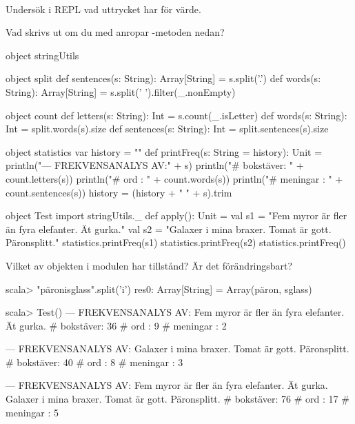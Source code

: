 
\QUESTBEGIN

\Task  \what~

\Subtask Undersök i REPL vad uttrycket  har för värde.

\Subtask Vad skrivs ut om du med  anropar -metoden nedan?
\begin{CodeSmall}
object stringUtils {
  object split {
    def sentences(s: String): Array[String] = s.split('.')
    def words(s: String): Array[String] = s.split(' ').filter(_.nonEmpty)
  }

  object count {
    def letters(s: String):   Int = s.count(_.isLetter)
    def words(s: String):     Int = split.words(s).size
    def sentences(s: String): Int = split.sentences(s).size
  }

  object statistics {
    var history = ""
    def printFreq(s: String = history): Unit = {
      println("\n--- FREKVENSANALYS AV:\n" + s)
      println("# bokstäver: " + count.letters(s))
      println("# ord      : " + count.words(s))
      println("# meningar : " + count.sentences(s))
      history = (history + " " + s).trim
    }
  }
}

object Test {
  import stringUtils._
  def apply(): Unit = {
    val s1 = "Fem     myror är fler än fyra elefanter. Ät gurka."
    val s2 = "Galaxer i mina braxer. Tomat är gott. Päronsplitt."
    statistics.printFreq(s1)
    statistics.printFreq(s2)
    statistics.printFreq()
  }
}
\end{CodeSmall}

\Subtask Vilket av objekten i modulen  har tillstånd? Är det förändringsbart?


\SOLUTION


\TaskSolved \what

\SubtaskSolved
\begin{REPLnonum}
scala> "päronisglass".split('i')
res0: Array[String] = Array(päron, sglass)
\end{REPLnonum}

\SubtaskSolved
\begin{REPLnonum}
scala> Test()
--- FREKVENSANALYS AV:
Fem     myror är fler än fyra elefanter. Ät gurka.
# bokstäver: 36
# ord      : 9
# meningar : 2

--- FREKVENSANALYS AV:
Galaxer i mina braxer. Tomat är gott. Päronsplitt.
# bokstäver: 40
# ord      : 8
# meningar : 3

--- FREKVENSANALYS AV:
Fem     myror är fler än fyra elefanter. Ät gurka. Galaxer i mina braxer. Tomat
är gott. Päronsplitt.
# bokstäver: 76
# ord      : 17
# meningar : 5
\end{REPLnonum}

